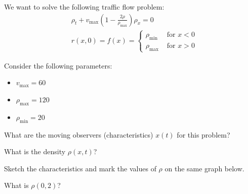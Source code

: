 \documentclass{workbook}
\begin{document}
\begin{slide}
\question \label{traffic:red}

\begin{problem}

We want to solve the following traffic flow problem:
\begin{align*}	
	& \rho_t + v_{\max} \left( 1 - \frac{2 \rho}{\rho_{\max}}\right) \rho_x = 0  \tag{Traffic flow model} \\
	& r(x,0) = f(x) = 
		\begin{cases}
			\rho_{\min}	& \text{ for } x<0\\
			\rho_{\max}	& \text{ for } x>0
		\end{cases}
\end{align*}

Consider the following parameters: 
\begin{itemize}
	\item $v_{\max}=60$
	\item $\rho_{\max} = 120$
	\item $\rho_{\min} = 20$
\end{itemize}
\end{problem}


\begin{parts}
	\item What are the moving observers (characteristics) $x(t)$ for this problem?
	\item What is the density $\rho(x,t)$?
	\item Sketch the characteristics and mark the values of $\rho$ on the same graph below.
	
	\begin{center}
	\end{center}

	
	\item What is $\rho(0,2)$?
\end{parts}

	
\end{slide}
\end{document}
